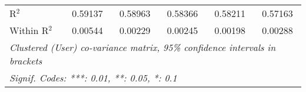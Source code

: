 \begin{table}[htbp]
\begin{threeparttable}[b]
\begin{tabular}{lccccc}
         R$^2$              & 0.59137         & 0.58963         & 0.58366        & 0.58211        & 0.57163\\  
         Within R$^2$       & 0.00544         & 0.00229         & 0.00245        & 0.00198        & 0.00288\\  
         \midrule \midrule
         \multicolumn{6}{l}{\emph{Clustered (User) co-variance matrix, 95\% confidence intervals in brackets}}\\
         \multicolumn{6}{l}{\emph{Signif. Codes: ***: 0.01, **: 0.05, *: 0.1}}\\
      \end{tabular}
   \end{threeparttable}
\end{table}


